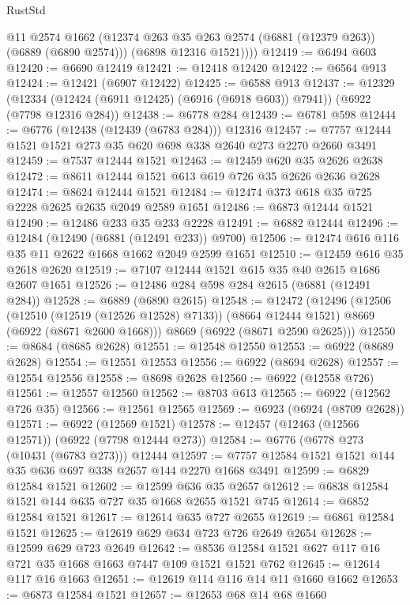 \begin{lexlean}{RustStd}
\begin{coremodule}
          @11
          @2574
          @1662
          (@12374 @263 @35 @263 @2574 (@6881 (@12379 @263)) (@6889 (@6890 @2574)))
          (@6898 @12316 @1521))))
@12419 := @6494 @603
@12420 := @6690 @12419
@12421 := @12418 @12420
@12422 := @6564 @913
@12424 := @12421 (@6907 @12422)
@12425 := @6588 @913
@12437 := @12329
    (@12334 (@12424 (@6911 @12425) (@6916 (@6918 @603)) @7941))
    (@6922 (@7798 @12316 @284))
@12438 := @6778 @284
@12439 := @6781 @598
@12444 := @6776 (@12438 (@12439 (@6783 @284))) @12316
@12457 := @7757 @12444 @1521 @1521 @273 @35 @620 @698 @338 @2640 @273 @2270 @2660 @3491
@12459 := @7537 @12444 @1521
@12463 := @12459 @620 @35 @2626 @2638
@12472 := @8611 @12444 @1521 @613 @619 @726 @35 @2626 @2636 @2628
@12474 := @8624 @12444 @1521
@12484 := @12474 @373 @618 @35 @725 @2228 @2625 @2635 @2049 @2589 @1651
@12486 := @6873 @12444 @1521
@12490 := @12486 @233 @35 @233 @2228
@12491 := @6882 @12444
@12496 := @12484 (@12490 (@6881 (@12491 @233)) @9700)
@12506 := @12474 @616 @116 @35 @11 @2622 @1668 @1662 @2049 @2599 @1651
@12510 := @12459 @616 @35 @2618 @2620
@12519 := @7107 @12444 @1521 @615 @35 @40 @2615 @1686 @2607 @1651
@12526 := @12486 @284 @598 @284 @2615 (@6881 (@12491 @284))
@12528 := @6889 (@6890 @2615)
@12548 := @12472
    (@12496
      (@12506
        (@12510 (@12519 (@12526 @12528) @7133))
        (@8664 @12444 @1521)
        @8669
        (@6922 (@8671 @2600 @1668)))
      @8669
      (@6922 (@8671 @2590 @2625)))
@12550 := @8684 (@8685 @2628)
@12551 := @12548 @12550
@12553 := @6922 (@8689 @2628)
@12554 := @12551 @12553
@12556 := @6922 (@8694 @2628)
@12557 := @12554 @12556
@12558 := @8698 @2628
@12560 := @6922 (@12558 @726)
@12561 := @12557 @12560
@12562 := @8703 @613
@12565 := @6922 (@12562 @726 @35)
@12566 := @12561 @12565
@12569 := @6923 (@6924 (@8709 @2628))
@12571 := @6922 (@12569 @1521)
@12578 := @12457 (@12463 (@12566 @12571)) (@6922 (@7798 @12444 @273))
@12584 := @6776 (@6778 @273 (@10431 (@6783 @273))) @12444
@12597 := @7757 @12584 @1521 @1521 @144 @35 @636 @697 @338 @2657 @144 @2270 @1668 @3491
@12599 := @6829 @12584 @1521
@12602 := @12599 @636 @35 @2657
@12612 := @6838 @12584 @1521 @144 @635 @727 @35 @1668 @2655 @1521 @745
@12614 := @6852 @12584 @1521
@12617 := @12614 @635 @727 @2655
@12619 := @6861 @12584 @1521
@12625 := @12619 @629 @634 @723 @726 @2649 @2654
@12628 := @12599 @629 @723 @2649
@12642 := @8536 @12584 @1521 @627 @117 @16 @721 @35 @1668 @1663 @7447 @109 @1521 @1521 @762
@12645 := @12614 @117 @16 @1663
@12651 := @12619 @114 @116 @14 @11 @1660 @1662
@12653 := @6873 @12584 @1521
@12657 := @12653 @68 @14 @68 @1660

\end{coremodule}
\end{lexlean}
